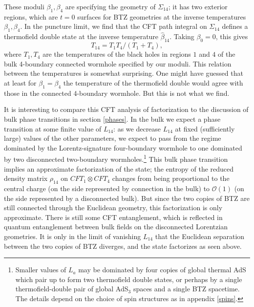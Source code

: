 \documentclass[12pt]{article}
\newcommand{\be}{\begin{equation}}
\newcommand{\ee}{\end{equation}}
\numberwithin{equation}{section}
\begin{document}
These moduli  $\beta_1, \beta_4$ are specifying the geometry of $\Sigma_{14}$; it has two exterior regions, which are $t=0$ surfaces for BTZ geometries at the inverse temperatures $\beta_1, \beta_4$. In the puncture limit, we find that the CFT path integral on $\Sigma_{14}$ defines a thermofield double state at the inverse temperature $\hat{\beta}_{14}$. Taking $\beta_0= 0$, this gives
\be
\label{BTZT}
T_{14} = T_1T_4/(T_1 + T_4),
\ee
where $T_1,T_4$ are the temperatures of the black holes in regions $1$ and $4$ of the bulk 4-boundary connected wormhole specified by our moduli.
This relation between the temperatures is somewhat surprising. One might have guessed that at least for $\beta_1 = \beta_4$ the temperature of the thermofield double would agree with those in the connected 4-boundary wormhole.  But this is not what we find.

It is interesting to compare this CFT analysis of factorization to the discussion of bulk phase transitions in section \ref{phases}.  In the bulk we expect a phase transition at some finite value of $L_{14}$: as we decrease $L_{14}$ at fixed (sufficiently large) values of the other parameters, we expect to pass from the regime dominated by the Lorentz-signature four-boundary wormhole to one dominated by two disconnected two-boundary wormholes.\footnote{Smaller values of $L_a$ may be dominated by four copies of global thermal AdS which pair up to form two thermofield double states, or perhaps by a single thermofield-double pair of global AdS${}_3$ spaces and a single BTZ spacetime.  The details depend on the choice of spin structures as in appendix \ref{spins}.} This bulk phase transition implies an approximate factorization of the state; the entropy of the reduced density matrix $\rho_{14}$ on $CFT_1 \otimes CFT_4$ changes from being proportional to the central charge (on the side represented by connection in the bulk) to $\mathcal O(1)$ (on the side represented by a disconnected bulk). But since the two copies of BTZ are still connected through the Euclidean geometry, this factorization is only approximate. There is still some CFT entanglement, which is reflected in quantum entanglement between bulk fields on the disconnected Lorentzian geometries. It is only in the limit of vanishing $L_{14}$ that the Euclidean separation between the two copies of BTZ diverges, and the state factorizes as seen above.
\end{document}
